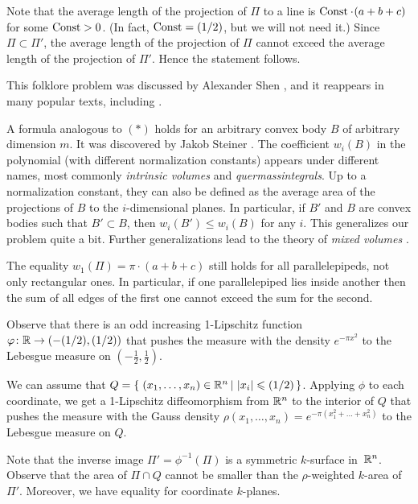 Note that the average length of the projection of $\Pi$ to a line is
$\Const\cdot(a+b+c)$ for some $\operatorname{\rm Const}\nolimits>0$.
(In fact, $\operatorname{\rm Const}\nolimits=(1/2)$, but we will not need it.)
Since $\Pi\subset \Pi'$,
the average length of the projection of $\Pi$
cannot exceed the average length of the projection of $\Pi'$.
Hence the statement follows.
\qeds

This folklore problem was discussed by Alexander Shen \cite{shen}, and it reappears in many popular texts, including \cite{winkler}.

A formula analogous to $({*})$
holds for an arbitrary convex body $B$ of arbitrary dimension $m$.
It was discovered by Jakob Steiner \cite{steiner}.
The coefficient $w_i(B)$ in the polynomial (with different normalization constants)
appears under different names, most commonly
\emph{intrinsic volumes} and
\emph{quermassintegrals}.
Up to a normalization constant,
they can also be defined as the average 
area of the projections of $B$ to the $i$-dimensional planes.
In particular, 
if $B'$ and $B$ are convex bodies such that $B'\subset B$,
then $w_i(B')\le w_i(B)$ for any $i$.
This generalizes our problem quite a bit.
Further generalizations lead to the theory of \emph{mixed volumes} \cite{burago-zalgaller}.

The equality $w_1(\Pi)=\pi\cdot (a+b+c)$ still holds for all parallelepipeds, not only rectangular ones.
In particular, if one parallelepiped 
lies inside another then the sum of all edges of the first one cannot exceed the sum for the second.

Observe that there is an odd increasing 1-Lipschitz function $\varphi\colon\mathbb{R}\to(-(1/2),(1/2))$ that pushes the measure with the density $e^{-\pi x^2}$ to the Lebesgue measure on $(-\tfrac12,\tfrac12)$.

We can assume that $Q=\set{(x_1,\ldots,x_n)\in \RR^n}{|x_i|\le \tfrac12}$.
Applying $\phi$ to each coordinate,
we get a 1-Lipschitz diffeomorphism from $\mathbb{R}^n$ to the interior of $Q$ that pushes the measure with the Gauss density 
$\rho(x_1,\ldots,x_n)=e^{-\pi (x_1^2+\ldots+x_n^2)}$ to the Lebesgue measure on $Q$.

Note that the inverse image $\Pi'=\phi^{-1}(\Pi)$ is a symmetric $k$-surface in~$\mathbb{R}^n$.
Observe that the area of $\Pi\cap Q$ cannot be smaller than the $\rho$-weighted $k$-area of $\Pi'$.
Moreover, we have equality for coordinate $k$-planes.

